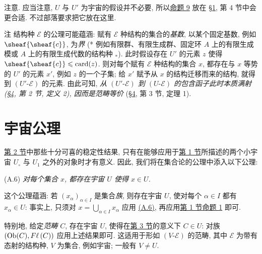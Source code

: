 注意. 应当注意, $U$ 与 $U'$ 为宇宙的假设并不必要, 所以\hyperlink{sga4.exp.I.appendix.II.sec.3.proposition.9}{命题 9} 放在 \hyperlink{sga4.exp.I.appendix.II.sec.1}{\S 1}, 第 4 节中会更合适. 不过部落要求把它放在这里.

\begin{enonce*}[remark]{注}
结构种 $\mathcal{E}$ 的公理可能蕴涵: 赋有 $\mathcal{E}$ 种结构的集合的\emph{基数}, 以某个固定基数, 例如 $\sheaf{\sheaf{c}}$, 为\emph{界} (* 例如有限群、有限生成群、固定环 $A$ 上的有限生成模或 $A$ 上的有限生成代数的结构种 ${}_{\mbox{*}}$). 此时假设存在 $U'$ 的元素 $z$ 使得 $\sheaf{\sheaf{c}}\leq\card(z)$. 则对每个赋有 $\mathcal{E}$ 种结构的集合 $x$, 都存在与 $x$ 等势的 $U'$ 的元素 $x'$, 例如 $z$ 的一个子集; 给 $x'$ 赋予从 $x$ 的结构迁移而来的结构, 就得到 $(U'\text{-}\mathcal{E})$ 的元素. 由此可知, \emph{从 $(U'\text{-}\mathcal{E})$ 到 $(U\text{-}\mathcal{E})$ 的包含函子此时本质满射 {\rm(\hyperlink{sga4.exp.I.appendix.II.sec.4}{\S 4}, 第 2 节, 定义 2)}, 因而是范畴等价} (\hyperlink{sga4.exp.I.appendix.II.sec.4}{\S 4}, 第 3 节, 定理 1).
\end{enonce*}



\section{宇宙公理}%
\hypertarget{sga4.exp.I.appendix.II.sec.4}{}\pageoriginale

\hyperlink{sga4.exp.I.appendix.II.sec.2}{第 2 节}中那些十分可喜的稳定性结果, 只有在能够应用于\hyperlink{sga4.exp.I.appendix.II.sec.1}{第 1 节}所描述的两个小宇宙 $U_\circ$ 与 $U_1$ 之外的对象时才有意义. 因此, 我们将在集合论的公理中添入以下公理:

\hypertarget{sga4.exp.I.appendix.II.sec.4.axiom.A.6}{}
(A.6) \emph{对每个集合 $x$, 都存在宇宙 $U$ 使得 $x\in U$.}

这个公理蕴涵: 若 $(x_\alpha)_{\alpha\in I}$ 是集合\emph{族}, 则存在宇宙 $U$, 使对每个 $\alpha\in I$ 都有 $x_\alpha\in U$: 事实上, 只须对 $x=\bigcup_{\alpha\in I}x_\alpha$ 应用 \hyperlink{sga4.exp.I.appendix.II.sec.4.axiom.A.6}{(A.6)}, 再应用\hyperlink{sga4.exp.I.appendix.II.sec.1}{第 1 节}\hyperlink{sga4.exp.I.appendix.II.sec.1.proposition.1}{命题 1} 即可.

特别地, 给定\emph{范畴} $C$, 存在宇宙 $U$, 使得在\hyperlink{sga4.exp.I.appendix.II.sec.3}{第 3 节}的意义下 $C\in U$: 对族 $(\operatorname{Ob}(C),F\ell\,(C))$ 应用上述结果即可. 这适用于形如 $(V\text{-}\mathcal{E})$ 的范畴, 其中 $\mathcal{E}$ 为带有态射的结构种, $V$ 为集合, 例如宇宙; 一般有 $V\neq U$.

